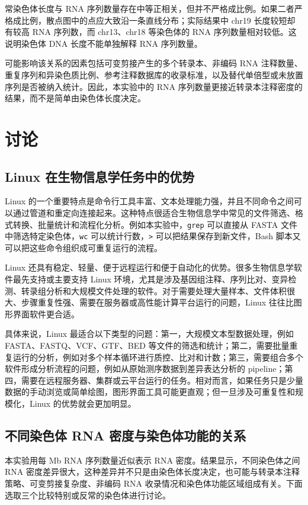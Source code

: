 \documentclass[12pt,a4paper,fontset=fandol]{ctexart}
\begin{document}
常染色体长度与 RNA 序列数量存在中等正相关，但并不严格成比例。如果二者严格成比例，散点图中的点应大致沿一条直线分布；实际结果中 chr19 长度较短却有较高 RNA 序列数，而 chr13、chr18 等染色体的 RNA 序列数量相对较低。这说明染色体 DNA 长度不能单独解释 RNA 序列数量。

可能影响该关系的因素包括可变剪接产生的多个转录本、非编码 RNA 注释数量、重复序列和异染色质比例、参考注释数据库的收录标准，以及替代单倍型或未放置序列是否被纳入统计。因此，本实验中的 RNA 序列数量更接近转录本注释密度的结果，而不是简单由染色体长度决定。

\section{讨论}

\subsection{Linux 在生物信息学任务中的优势}

Linux 的一个重要特点是命令行工具丰富、文本处理能力强，并且不同命令之间可以通过管道和重定向连接起来。这种特点很适合生物信息学中常见的文件筛选、格式转换、批量统计和流程化分析。例如本实验中，\texttt{grep} 可以直接从 FASTA 文件中筛选特定染色体，\texttt{wc} 可以统计行数，\texttt{>} 可以把结果保存到新文件，Bash 脚本又可以把这些命令组织成可重复运行的流程。

Linux 还具有稳定、轻量、便于远程运行和便于自动化的优势。很多生物信息学软件最先支持或主要支持 Linux 环境，尤其是涉及基因组注释、序列比对、变异检测、转录组分析和大规模文件处理的软件。对于需要处理大量样本、文件体积很大、步骤重复性强、需要在服务器或高性能计算平台运行的问题，Linux 往往比图形界面软件更合适。

具体来说，Linux 最适合以下类型的问题：第一，大规模文本型数据处理，例如 FASTA、FASTQ、VCF、GTF、BED 等文件的筛选和统计；第二，需要批量重复运行的分析，例如对多个样本循环进行质控、比对和计数；第三，需要组合多个软件形成分析流程的问题，例如从原始测序数据到差异表达分析的 pipeline；第四，需要在远程服务器、集群或云平台运行的任务。相对而言，如果任务只是少量数据的手动浏览或简单绘图，图形界面工具可能更直观；但一旦涉及可重复性和规模化，Linux 的优势就会更加明显。

\subsection{不同染色体 RNA 密度与染色体功能的关系}

本实验用每 Mb RNA 序列数量近似表示 RNA 密度。结果显示，不同染色体之间 RNA 密度差异很大，这种差异并不只是由染色体长度决定，也可能与转录本注释策略、可变剪接复杂度、非编码 RNA 收录情况和染色体功能区域组成有关。下面选取三个比较特别或反常的染色体进行讨论。
\end{document}
